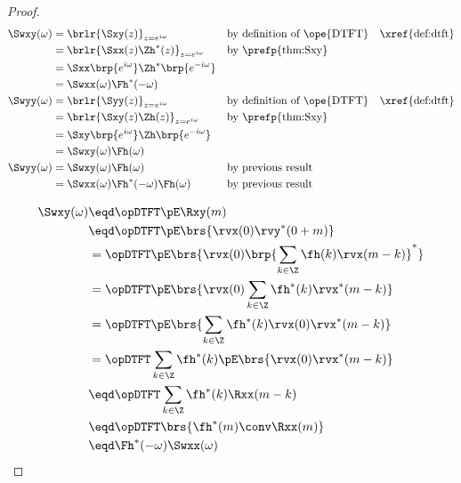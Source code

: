 \begin{proof}
\begin{align*}
   \Swxy(\omega)
     &= \brlr{\Sxy(z)}_{z=e^{i\omega}}
     && \text{by definition of \ope{DTFT}}
     && \text{\xref{def:dtft}}
   \\&= \brlr{\Sxx(z)\Zh^\ast(z)}_{z=e^{i\omega}}
     && \text{by \prefp{thm:Sxy}}
   \\&= \Sxx\brp{e^{i\omega}}\Zh^\ast\brp{e^{-i\omega}}
   \\&= \Swxx(\omega) \Fh^\ast(-\omega)
   \\
   \Swyy(\omega)
     &= \brlr{\Syy(z)}_{z=e^{i\omega}}
     && \text{by definition of \ope{DTFT}}
     && \text{\xref{def:dtft}}
   \\&= \brlr{\Sxy(z)\Zh(z)}_{z=e^{i\omega}}
     && \text{by \prefp{thm:Sxy}}
   \\&= \Sxy\brp{e^{i\omega}}\Zh\brp{e^{-i\omega}}
   \\&= \Swxy(\omega) \Fh(\omega)
   \\
   \Swyy(\omega)
     &= \Swxy(\omega) \Fh(\omega)
     && \text{by previous result}
   \\&= \Swxx(\omega) \Fh^\ast(-\omega) \Fh(\omega)
     && \text{by previous result}
\end{align*}

\begin{align*}
  \Swxy(\omega)
    &\eqd \opDTFT\pE\Rxy(m)
  \\&\eqd \opDTFT\pE\brs{\rvx(0)\rvy^\ast(0+m)}
  \\&=    \opDTFT\pE\brs{\rvx(0)\brp{\sum_{k\in\Z} \fh(k)           \rvx(m-k)}^\ast}
  \\&=    \opDTFT\pE\brs{\rvx(0)     \sum_{k\in\Z} \fh^\ast(k)      \rvx^\ast(m-k)}
  \\&=    \opDTFT\pE\brs{            \sum_{k\in\Z} \fh^\ast(k)      \rvx(0)\rvx^\ast(m-k)}
  \\&=    \opDTFT                    \sum_{k\in\Z} \fh^\ast(k) \pE\brs{\rvx(0)\rvx^\ast(m-k)}
  \\&\eqd \opDTFT                    \sum_{k\in\Z} \fh^\ast(k) \Rxx(m-k)
  \\&\eqd \opDTFT                             \brs{\fh^\ast(m) \conv \Rxx(m)}
  \\&\eqd \Fh^\ast(-\omega) \Swxx(\omega)
\end{align*}
\end{proof}

